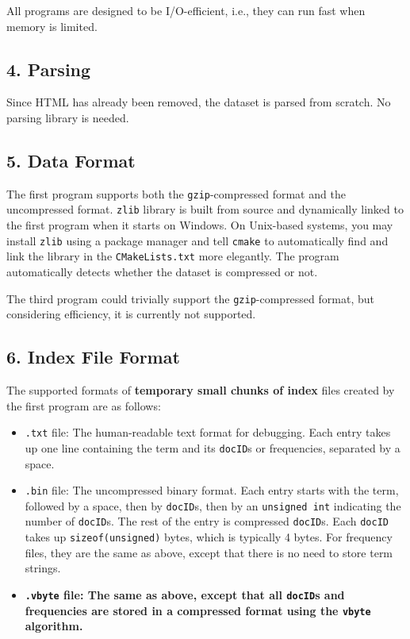 \documentclass[12pt]{article}
\begin{document}
All programs are designed to be I/O-efficient, i.e., they can run fast
when memory is limited.

\hypertarget{4-parsing}{%
\subsection{4. Parsing}\label{4-parsing}}

Since HTML has already been removed, the dataset is parsed from scratch.
No parsing library is needed.

\hypertarget{5-data-format}{%
\subsection{5. Data Format}\label{5-data-format}}

The first program supports both the \texttt{gzip}-compressed format and
the uncompressed format. \texttt{zlib} library is built from source and
dynamically linked to the first program when it starts on Windows. On
Unix-based systems, you may install \texttt{zlib} using a package
manager and tell \texttt{cmake} to automatically find and link the
library in the \texttt{CMakeLists.txt} more elegantly. The program
automatically detects whether the dataset is compressed or not.

The third program could trivially support the \texttt{gzip}-compressed
format, but considering efficiency, it is currently not supported.

\hypertarget{6-index-file-format}{%
\subsection{6. Index File Format}\label{6-index-file-format}}

The supported formats of \textbf{temporary small chunks of index} files
created by the first program are as follows:

\begin{itemize}
\item
  \texttt{.txt} file: The human-readable text format for debugging. Each
  entry takes up one line containing the term and its \texttt{docID}s or
  frequencies, separated by a space.
\item
  \texttt{.bin} file: The uncompressed binary format. Each entry starts
  with the term, followed by a space, then by \texttt{docID}s, then by
  an \texttt{unsigned\ int} indicating the number of \texttt{docID}s.
  The rest of the entry is compressed \texttt{docID}s. Each
  \texttt{docID} takes up \texttt{sizeof(unsigned)} bytes, which is
  typically 4 bytes. For frequency files, they are the same as above,
  except that there is no need to store term strings.
\item
  \textbf{\texttt{.vbyte} file: The same as above, except that all
  \texttt{docID}s and frequencies are stored in a compressed format
  using the \texttt{vbyte} algorithm.}
\end{itemize}
\end{document}
